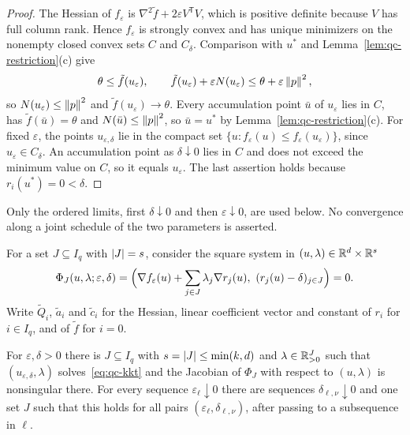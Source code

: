 \begin{proof}
The Hessian of $f_\varepsilon$ is $\nabla^2\tilde f+2\varepsilon V^{\mathsf T}V$,
which is positive definite because $V$ has full column rank. Hence
$f_\varepsilon$ is strongly convex and has unique minimizers on the nonempty
closed convex sets $C$ and $C_\delta$. Comparison with $u^*$ and
Lemma~\ref{lem:qc-restriction}(c) give
\[
\theta\le\tilde f(u_\varepsilon),\qquad
\tilde f(u_\varepsilon)+\varepsilon N(u_\varepsilon)\le\theta+\varepsilon\left\lVert p\right\rVert^2,
\]
so $N(u_\varepsilon)\le\left\lVert p\right\rVert^2$ and $\tilde f(u_\varepsilon)\to\theta$.
Every accumulation point $\bar u$ of $u_\varepsilon$ lies in $C$, has
$\tilde f(\bar u)=\theta$ and $N(\bar u)\le\left\lVert p\right\rVert^2$, so $\bar u=u^*$ by
Lemma~\ref{lem:qc-restriction}(c). For fixed $\varepsilon$, the points
$u_{\varepsilon,\delta}$ lie in the compact set
$\{u:f_\varepsilon(u)\le f_\varepsilon(u_\varepsilon)\}$, since
$u_\varepsilon\in C_\delta$. An accumulation point as $\delta\downarrow0$ lies
in $C$ and does not exceed the minimum value on $C$, so it equals
$u_\varepsilon$. The last assertion holds because $r_i(u^*)=0<\delta$.
\end{proof}

Only the ordered limits, first $\delta\downarrow0$ and then
$\varepsilon\downarrow0$, are used below. No convergence along a joint
schedule of the two parameters is asserted.

For a set $J\subseteq I_q$ with $\left\lvert J\right\rvert=s$, consider the square system in
$(u,\lambda)\in\mathbb R^{d}\times\mathbb R^{s}$
\begin{equation}
\label{eq:qc-kkt}
\Phi_J(u,\lambda;\varepsilon,\delta)=
\Bigl(\nabla f_\varepsilon(u)+\sum_{j\in J}\lambda_j\nabla r_j(u),\
(r_j(u)-\delta)_{j\in J}\Bigr)=0 .
\end{equation}
Write $\tilde Q_i$, $\tilde a_i$ and $\tilde c_i$ for the Hessian, linear
coefficient vector and constant of $r_i$ for $i\in I_q$, and of $\tilde f$ for
$i=0$.

\begin{lemma}
\label{lem:qc-kkt}
For $\varepsilon,\delta>0$ there is $J\subseteq I_q$ with
$s=\left\lvert J\right\rvert\le\min(k,d)$ and $\lambda\in\mathbb R^J_{>0}$ such that
$(u_{\varepsilon,\delta},\lambda)$ solves~\eqref{eq:qc-kkt} and the Jacobian
of $\Phi_J$ with respect to $(u,\lambda)$ is nonsingular there. For every
sequence $\varepsilon_\ell\downarrow0$ there are sequences
$\delta_{\ell,\nu}\downarrow0$ and one set $J$ such that this holds for all
pairs $(\varepsilon_\ell,\delta_{\ell,\nu})$, after passing to a subsequence
in $\ell$.
\end{lemma}

